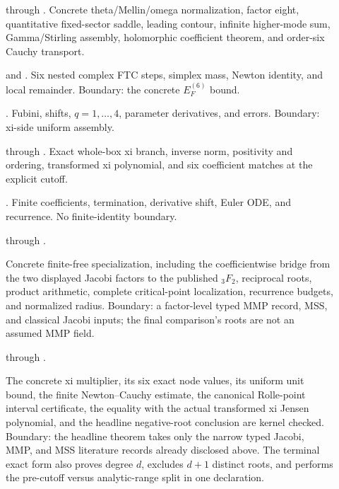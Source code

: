 \documentclass[10pt]{article}
\begin{document}
\begin{description}
\item[] through .
Concrete theta/Mellin/omega normalization, factor eight, quantitative
fixed-sector saddle, leading contour, infinite higher-mode sum, Gamma/Stirling
assembly, holomorphic coefficient theorem, and order-six Cauchy transport.
\item[] and
.
Six nested complex FTC steps, simplex mass, Newton identity, and local
remainder. Boundary: the concrete $E_F^{(6)}$ bound.
\item[]. Fubini, shifts, $q=1,\ldots,4$,
parameter derivatives, and errors. Boundary: xi-side uniform assembly.
\item[] through .
Exact whole-box xi branch, inverse norm, positivity and ordering, transformed
xi polynomial, and six coefficient matches at the explicit cutoff.
\item[]. Finite coefficients, termination,
derivative shift, Euler ODE, and recurrence. No finite-identity boundary.
\item[] through
.\par
Concrete finite-free specialization, including the coefficientwise bridge
from the two displayed Jacobi factors to the published ${}_3F_2$, reciprocal
roots, product arithmetic, complete critical-point localization, recurrence
budgets, and normalized radius. Boundary: a factor-level typed MMP record,
MSS, and classical Jacobi inputs; the final comparison's roots are not an
assumed MMP field.
\item[] through
.\par
The concrete xi multiplier, its six exact node values, its uniform unit
bound, the finite Newton--Cauchy estimate, the canonical Rolle-point
interval certificate, the equality with the actual transformed xi Jensen
polynomial, and the headline negative-root conclusion are kernel checked.
Boundary: the headline theorem takes only the narrow typed Jacobi, MMP, and
MSS literature records already disclosed above.  The terminal exact form
also proves degree $d$, excludes $d+1$ distinct roots, and performs the
pre-cutoff versus analytic-range split in one declaration.
\end{description}
\end{document}
